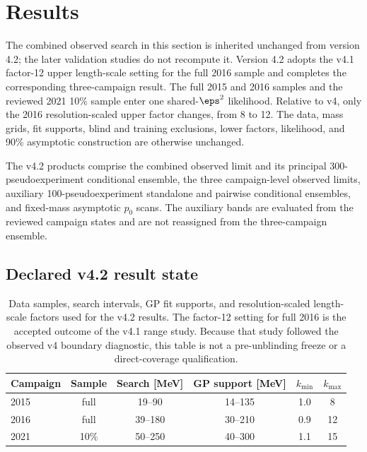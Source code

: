 \providecommand{\VFourPTwoLocalPZeroMinimum}{\ensuremath{3.25918\times10^{-5}}}
\providecommand{\VFourPTwoLocalPZeroMass}{\SI{65}{MeV}}
\providecommand{\VFourPTwoLocalZ}{\ensuremath{3.99321}}
\providecommand{\VFourPTwoEffectiveTrials}{\ensuremath{35.3814}}
\providecommand{\VFourPTwoSidakValue}{\ensuremath{0.00115250}}
\providecommand{\VFourPTwoSidakZ}{\ensuremath{3.04783}}
\providecommand{\VFourPTwoEpsHat}{\ensuremath{6.42706\times10^{-6}}}
\providecommand{\VFourPTwoEpsHatSigma}{\ensuremath{1.61009\times10^{-6}}}

\section{Results}
\label{sec:results}

The combined observed search in this section is inherited unchanged from version 4.2;
the later validation studies do not recompute it.  Version 4.2 adopts the v4.1
factor-12 upper length-scale setting for the full 2016 sample and completes the
corresponding three-campaign result.  The full 2015 and 2016 samples and the reviewed
2021 10\% sample enter one shared-$\eps^2$ likelihood.  Relative to v4, only the 2016
resolution-scaled upper factor changes, from 8 to 12.  The data, mass grids, fit
supports, blind and training exclusions, lower factors, likelihood, and 90\%
asymptotic \CLs{} construction are otherwise unchanged.

The v4.2 products comprise the combined observed limit and its principal
300-pseudoexperiment conditional ensemble, the three campaign-level observed
limits, auxiliary 100-pseudoexperiment standalone and pairwise conditional
ensembles, and fixed-mass asymptotic $p_0$ scans. The auxiliary bands are
evaluated from the reviewed campaign states and are not reassigned from the
three-campaign ensemble.

\subsection{Declared v4.2 result state}
\label{sec:results-v4p2-analysis-state}

\begin{table}[H]
\centering
\small
{\setlength{\tabcolsep}{5pt}
\begin{tabular}{lccccc}
\toprule
Campaign & Sample & Search [MeV] & GP support [MeV] &
$k_{\min}$ & $k_{\max}$ \\
\midrule
2015 & full & 19--90  & 14--135 & 1.0 & 8 \\
2016 & full & 39--180 & 30--210 & 0.9 & 12 \\
2021 & 10\% & 50--250 & 40--300 & 1.1 & 15 \\
\bottomrule
\end{tabular}
}
\caption{Data samples, search intervals, GP fit supports, and
resolution-scaled length-scale factors used for the v4.2 results. The factor-12
setting for full 2016 is the accepted outcome of the v4.1 range study. Because
that study followed the observed v4 boundary diagnostic, this table is not a
pre-unblinding freeze or a direct-coverage qualification.}
\label{tab:results-v4p2-configuration}
\end{table}

